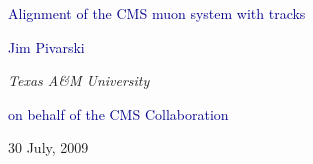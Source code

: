 \documentclass[compress]{beamer}
\begin{document}
\begin{frame}
\vfill
\begin{center}
\textcolor{darkblue}{\Large Alignment of the CMS muon system with tracks}

\vfill
\begin{center}
\large
\textcolor{darkblue}{Jim Pivarski}

\scriptsize
\vspace{0.25 cm}
{\it Texas A\&M University}

\vspace{0.75 cm}
\small
\textcolor{darkblue}{on behalf of the CMS Collaboration}
\end{center}

\vfill
30 July, 2009

\end{center}
\end{frame}


\small
\end{document}
